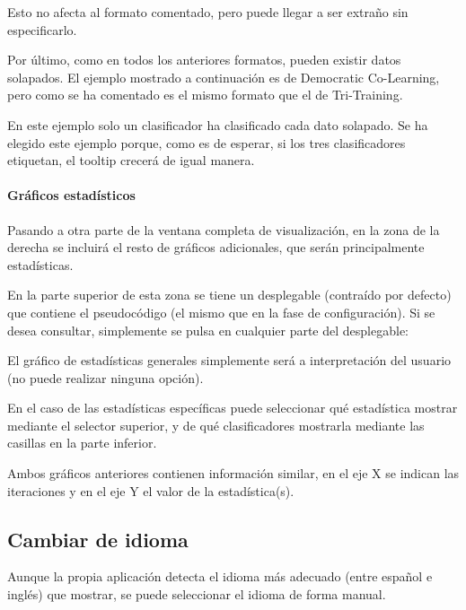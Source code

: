 Esto no afecta al formato comentado, pero puede llegar a ser extraño sin
especificarlo.

Por último, como en todos los anteriores formatos, pueden existir datos
solapados. El ejemplo mostrado a continuación es de Democratic Co-Learning, pero
como se ha comentado es el mismo formato que el de Tri-Training.


En este ejemplo solo un clasificador ha clasificado cada dato solapado. Se ha
elegido este ejemplo porque, como es de esperar, si los tres clasificadores
etiquetan, el tooltip crecerá de igual manera.

\paragraph{Gráficos estadísticos} Pasando a otra parte de la ventana completa de
visualización, en la zona de la derecha se incluirá el resto de gráficos
adicionales, que serán principalmente estadísticas.


En la parte superior de esta zona se tiene un desplegable (contraído por
defecto) que contiene el pseudocódigo (el mismo que en la fase de
configuración). Si se desea consultar, simplemente se pulsa en cualquier parte
del desplegable:


El gráfico de estadísticas generales simplemente será a interpretación del
usuario (no puede realizar ninguna opción). 

En el caso de las estadísticas específicas puede seleccionar qué estadística
mostrar mediante el selector superior, y de qué clasificadores mostrarla
mediante las casillas en la parte inferior.

Ambos gráficos anteriores contienen información similar, en el eje X se indican
las iteraciones y en el eje Y el valor de la estadística(s).

\subsection{Cambiar de idioma}

Aunque la propia aplicación detecta el idioma más adecuado (entre español e
inglés) que mostrar, se puede seleccionar el idioma de forma manual.

